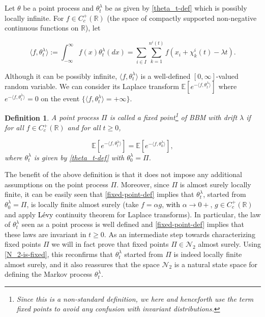 \documentclass[a4paper,reqno]{amsart}%
\newcommand{\1}{\mathbf 1}
\theoremstyle{mine}
\numberwithin{theorem}{section}
\newtheorem{definition}[theorem]{Definition}
\numberwithin{equation}{section}
\theoremstyle{remark}
\begin{document}
Let $\theta$ be a point process and $\theta_t^\lambda$ be as given by \eqref{theta_t-def} which is possibly locally infinite. For $f\in C_c^+(\mathbb{R})$ (the space of compactly supported non-negative continuous functions on $\mathbb{R}$), let 

\begin{equation}
    \langle f, \theta_t^\lambda \rangle:= \int_{-\infty}^\infty f(x)\theta_t^\lambda (dx)=\sum\limits_{i \in I} \sum_{k=1}^{n^i(t)} f(x_i+\chi_k^i(t)-\lambda t).
\end{equation}

Although it can be possibly infinite, $\langle f, \theta_t^\lambda \rangle$ is a well-defined $[0, \infty]$-valued random variable. We can consider its Laplace transform $\mathbb{E}[e^{-\langle f, \theta_t^\lambda \rangle}]$ where $e^{-\langle f, \theta_t^\lambda \rangle} = 0 $ on the event $\{\langle f, \theta_t^\lambda \rangle = + \infty\}$.

\begin{definition} \label{def-fixed-point}
    A point process $\Pi$ is called a fixed point\footnote{Since this is a non-standard definition, we here and henceforth use the term \textit{fixed points} to avoid any confusion with invariant distributions.} of BBM with drift $\lambda$ if for all $f\in C_c^+(\mathbb{R})$ and for all $t\geq 0$,

    \begin{equation}\label{fixed-point-def}
        \mathbb{E}[e^{-\langle f, \theta_t^\lambda \rangle}] = \mathbb{E}[e^{-\langle f, \theta_0^\lambda \rangle}],
     \end{equation} 
    where $\theta_t^\lambda$ is given by \eqref{theta_t-def} with $\theta_0^\lambda = \Pi$. 
    
\end{definition}

The benefit of the above definition is that it does not impose any additional assumptions on the point process $\Pi$. Moreover, since $\Pi$ is almost surely locally finite, it can be easily seen that \eqref{fixed-point-def} implies that $\theta_t^\lambda$, started from $\theta_0^\lambda = \Pi$, is locally finite almost surely (take $f= \alpha g$, \textcolor{black}{with} $\alpha \to 0+$, $g \in C_c^+(\mathbb{R})$ and apply \textcolor{black}{L\'evy} continuity theorem for Laplace transforms). In particular, the law of $\theta_t^\lambda$ seen as a point process is well defined and \eqref{fixed-point-def} implies that these laws are invariant in $t\geq 0$. As an intermediate step towards characterizing fixed points $\Pi$ we will in fact prove that fixed points $\Pi \in \mathcal{N}_2$ almost surely. Using \eqref{N_2-is-fixed}, this reconfirms that $\theta_t^\lambda$ started from $\Pi$ is indeed locally finite almost surely, and it also reassures that the space $\mathcal{N}_2$ is a natural state space for defining the Markov process $\theta_t^\lambda$. \\     
\end{document}
